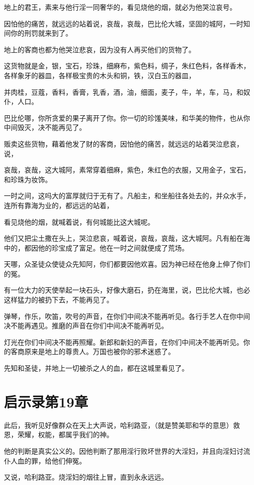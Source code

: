 \documentclass[12pt,oneside]{book}
\begin{document}
地上的君王，素来与他行淫一同奢华的，看见烧他的烟，就必为他哭泣哀号。

因怕他的痛苦，就远远的站着说，哀哉，哀哉，巴比伦大城，坚固的城阿，一时知间你的刑罚就来到了。

地上的客商也都为他哭泣悲哀，因为没有人再买他们的货物了。

这货物就是金，银，宝石，珍珠，细麻布，紫色料，绸子，朱红色料，各样香木，各样象牙的器皿，各样极宝贵的木头和铜，铁，汉白玉的器皿，

并肉桂，豆蔻，香料，香膏，乳香，酒，油，细面，麦子，牛，羊，车，马，和奴仆，人口。

巴比伦哪，你所贪爱的果子离开了你。你一切的珍馐美味，和华美的物件，也从你中间毁灭，决不能再见了。

贩卖这些货物，藉着他发了财的客商，因怕他的痛苦，就远远的站着哭泣悲哀，说，

哀哉，哀哉，这大城阿，素常穿着细麻，紫色，朱红色的衣服，又用金子，宝石，和珍珠为妆饰。

一时之间，这吗大的富厚就归于无有了。凡船主，和坐船往各处去的，并众水手，连所有靠海为业的，都远远的站着，

看见烧他的烟，就喊着说，有何城能比这大城呢。

他们又把尘土撒在头上，哭泣悲哀，喊着说，哀哉，哀哉，这大城阿。凡有船在海中的，都因他的珍宝成了富足。他在一时之间就便成了荒场。

天哪，众圣徒众使徒众先知阿，你们都要因他欢喜。因为神已经在他身上伸了你们的冤。

有一位大力的天使举起一块石头，好像大磨石，扔在海里，说，巴比伦大城，也必这样猛力的被扔下去，不能再见了。

弹琴，作乐，吹笛，吹号的声音，在你们中间决不能再听见。各行手艺人在你中间决不能再遇见。推磨的声音在你们中间决不能再听见。

灯光在你们中间决不能再照耀。新郎和新妇的声音，在你们中间决不能再听见。你的客商原来是地上的尊贵人。万国也被你的邪术迷惑了。

先知和圣徒，并地上一切被杀之人的血，都在这城里看见了。

\chapter{启示录第19章}
此后，我听见好像群众在天上大声说，哈利路亚，（就是赞美耶和华的意思）救恩，荣耀，权能，都属乎我们的神。

他的判断是真实公义的。因他判断了那用淫行败坏世界的大淫妇，并且向淫妇讨流仆人血的罪，给他们伸冤。

又说，哈利路亚。烧淫妇的烟往上冒，直到永永远远。
\end{document}
